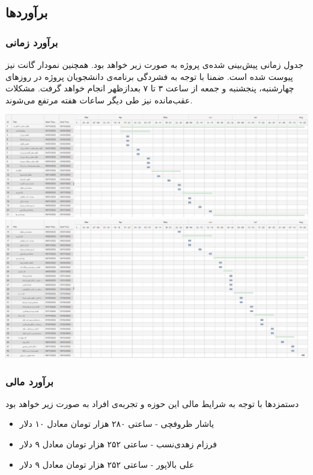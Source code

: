 \subsection{برآورد‌ها}
\subsubsection{برآورد زمانی}
جدول زمانی پیش‌بینی شده‌ی پروژه به صورت زیر خواهد بود. همچنین نمودار گانت نیز پیوست شده است.
ضمنا با توجه به فشردگی برنامه‌ی دانشجویان پروژه در روزهای چهارشنبه، پنجشنبه و جمعه از ساعت ۳ تا ۷ بعدازظهر انجام خواهد گرفت. مشکلات عقب‌مانده نیز طی دیگر ساعات هفته مرتفع می‌شوند.

\includegraphics[width=1\textwidth]{Images/Gantt_1.png}
\newline
\includegraphics[width=1\textwidth]{Images/Gantt_2.png}

\subsubsection{برآورد مالی}
دستمزدها با توجه به شرایط مالی این حوزه و تجربه‌ی افراد به صورت زیر خواهد بود
\begin{itemize}
    \item یاشار ظروفچی - ساعتی ۲۸۰ هزار تومان معادل ۱۰ دلار
    \item فرزام زهدی‌نسب - ساعتی ۲۵۲ هزار تومان معادل ۹ دلار
    \item علی بالا‌پور - ساعتی ۲۵۲ هزار تومان معادل ۹ دلار
\end{itemize}


